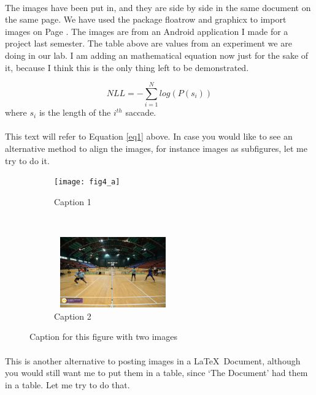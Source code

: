 \documentclass[titlepage,11pt,a4paper]{article}
\begin{document}
\paragraph{} The images have been put in, and they are side by side in the same document on the same page. We have used the package floatrow and graphicx to import images on Page \pageref{frow}. The images are from an Android application I made for a project last semester. The table above are values from an experiment we are doing in our lab. I am adding an mathematical equation now just for the sake of it, because I think this is the only thing left to be demonstrated. 

\begin{equation} \label{eq1}
NLL=-\sum_{i=1}^{N}log(P(s_{i}))
\end{equation}
where $s_i$ is the length of the $i^{th}$ saccade.
\paragraph{} This text will refer to Equation \ref{eq1} above. In case you would like to see an alternative method to align the images, for instance images as subfigures, let me try to do it.
\newpage


\begin{figure}[t!]
    \centering
    \begin{subfigure}[t]{0.5\textwidth}
        \centering
        \texttt{[image: fig4\_a]}
        \caption{Caption 1}
    \end{subfigure}%
    ~ 
    \begin{subfigure}[t]{0.5\textwidth}
        \centering
        \includegraphics[height=1.2in,width=2in]{fig4_b}
        \caption{Caption 2}
    \end{subfigure}
    \caption{Caption for this figure with two images}
\end{figure}

\paragraph{} This is another alternative to posting images in a \LaTeX\ Document, although you would still want me to put them in a table,  since `The Document' had them in a table. Let me try to do that.
\end{document}
